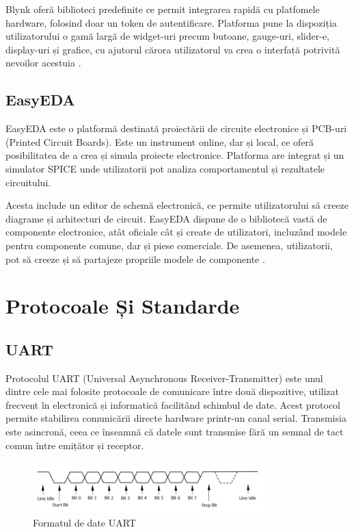 Blynk oferă biblioteci predefinite ce permit integrarea rapidă cu platfomele hardware, folosind doar un token de autentificare. Platforma pune la dispoziția utilizatorului o gamă largă de widget-uri precum butoane, gauge-uri, slider-e, display-uri și grafice, cu ajutorul cărora utilizatorul va crea o interfață potrivită nevoilor acestuia \cite{blynk_doc}. 

\subsection{EasyEDA}
EasyEDA este o platformă destinată proiectării de circuite electronice și PCB-uri (Printed Circuit Boards). Este un instrument online, dar și local, ce oferă posibilitatea de a crea și simula proiecte electronice. Platforma are integrat și un simulator SPICE unde utilizatorii pot analiza comportamentul și rezultatele circuitului.

Acesta include un editor de schemă electronică, ce permite utilizatorului să creeze diagrame și arhitecturi de circuit. EasyEDA dispune de o bibliotecă vastă de componente electronice, atât oficiale cât și create de utilizatori, incluzând modele pentru componente comune, dar și piese comerciale. De asemenea, utilizatorii, pot să creeze și să partajeze  propriile modele de componente \cite{easyEda_doc}.


\section{Protocoale Și Standarde}
\subsection{UART}
Protocolul UART (Universal Asynchronous Receiver-Transmitter) este unul dintre cele mai folosite protocoale de comunicare între două dispozitive, utilizat frecvent în electronică și informatică facilitând schimbul de date. Acest protocol permite stabilirea comunicării directe hardware printr-un canal serial. Transmisia este asincronă, ceea ce înseamnă că datele sunt transmise fără un semnal de tact comun între emițător și receptor.

\begin{figure}[H]
\includegraphics[width=0.8\textwidth]{images/uart_protocol.png}
\caption{Formatul de date UART \cite{uart_poza}}
\label{fig:uart_protocol}
\end{figure}

